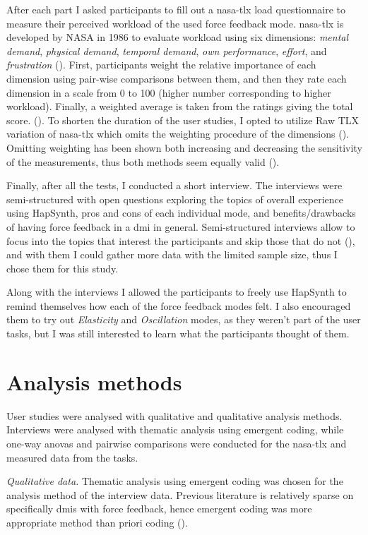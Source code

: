After each part I asked participants to fill out a \gls{nasa-tlx} load questionnaire to measure their perceived workload of the used force feedback mode. \gls{nasa-tlx} is developed by NASA in 1986 to evaluate workload using six dimensions: \textit{mental demand}, \textit{physical demand}, \textit{temporal demand}, \textit{own performance}, \textit{effort}, and \textit{frustration} (\cite{hart1986}). First, participants weight the relative importance of each dimension using pair-wise comparisons between them, and then they rate each dimension in a scale from 0 to 100 (higher number corresponding to higher workload). Finally, a weighted average is taken from the ratings giving the total score. (\cite{hart1986}). To shorten the duration of the user studies, I opted to utilize Raw TLX variation of \gls{nasa-tlx} which omits the weighting procedure of the dimensions (\cite{hart2006}). Omitting weighting has been shown both increasing and decreasing the sensitivity of the measurements, thus both methods seem equally valid (\cite{hart2006}).

Finally, after all the tests, I conducted a short interview. The interviews were semi-structured with open questions exploring the topics of overall experience using HapSynth, pros and cons of each individual mode, and benefits/drawbacks of having force feedback in a \gls{dmi} in general. Semi-structured interviews allow to focus into the topics that interest the participants and skip those that do not (\cite{lazar2017}), and with them I could gather more data with the limited sample size, thus I chose them for this study.

Along with the interviews I allowed the participants to freely use HapSynth to remind themselves how each of the force feedback modes felt. I also encouraged them to try out \textit{Elasticity} and \textit{Oscillation} modes, as they weren't part of the user tasks, but I was still interested to learn what the participants thought of them.

\section{Analysis methods}

User studies were analysed with qualitative and qualitative analysis methods. Interviews were analysed with thematic analysis using emergent coding, while one-way \glspl{anova} and pairwise comparisons were conducted for the \gls{nasa-tlx} and measured data from the tasks.

\textit{Qualitative data.} Thematic analysis using emergent coding was chosen for the analysis method of the interview data. Previous literature is relatively sparse on specifically \glspl{dmi} with force feedback, hence emergent coding was more appropriate method than priori coding (\cite{lazar2017}).

